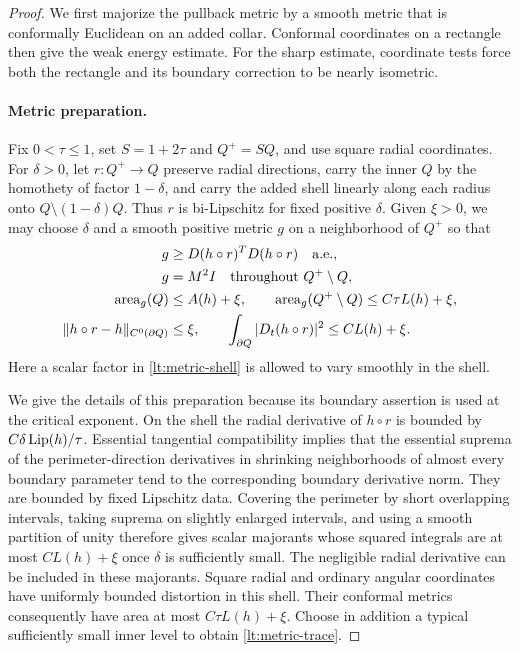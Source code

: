 \begin{proof}
We first majorize the pullback metric by a smooth metric that is
conformally Euclidean on an added collar. Conformal coordinates on a
rectangle then give the weak energy estimate. For the sharp estimate,
coordinate tests force both the rectangle and its boundary correction
to be nearly isometric.

\paragraph{Metric preparation.}
Fix $0<\tau\leq1$, set $S=1+2\tau$ and
$Q^+=SQ$, and use square radial coordinates.  For $\delta>0$, let
$r:Q^+\to Q$ preserve radial directions, carry the inner $Q$ by the
homothety of factor $1-\delta$, and carry the added shell linearly along
each radius onto $Q\setminus(1-\delta)Q$.  Thus $r$ is bi-Lipschitz
for fixed positive $\delta$.  Given $\xi>0$, we may choose $\delta$
and a smooth positive metric $g$ on a neighborhood of $Q^+$ so that
\begin{align}
 g&\geq D(h\circ r)^TD(h\circ r)\quad\hbox{a.e.},
       \label{lt:metric-dominates}\\
 g&=M^2I\quad\hbox{throughout }Q^+\setminus Q,
       \label{lt:metric-shell}\\
 \operatorname{area}_g(Q)&\leq A(h)+\xi,
 \qquad
 \operatorname{area}_g(Q^+\setminus Q)
       \leq C\tau L(h)+\xi,                 \label{lt:metric-area}\\
 \|h\circ r-h\|_{C^0(\partial Q)}&\leq\xi,
 \qquad
 \int_{\partial Q}|D_t(h\circ r)|^2
       \leq CL(h)+\xi.                    \label{lt:metric-trace}
\end{align}
Here a scalar factor in \eqref{lt:metric-shell} is allowed to vary
smoothly in the shell.

We give the details of this preparation because its boundary assertion
is used at the critical exponent.  On the shell the radial derivative
of $h\circ r$ is bounded by $C\delta\operatorname{Lip}(h)/\tau$.  Essential
tangential compatibility implies that the essential suprema of the
perimeter-direction derivatives in shrinking neighborhoods of almost
every boundary parameter tend to the corresponding boundary derivative
norm.  They are bounded by fixed Lipschitz data.  Covering the perimeter
by short overlapping intervals, taking suprema on slightly enlarged
intervals, and using a smooth partition of unity therefore gives scalar
majorants whose squared integrals are at most $CL(h)+\xi$ once
$\delta$ is sufficiently small.  The negligible radial derivative can
be included in these majorants.  Square radial and ordinary angular
coordinates have uniformly bounded distortion in this shell.  Their
conformal metrics consequently have area at most $C\tau L(h)+\xi$.
Choose in addition a typical sufficiently small inner level to obtain
\eqref{lt:metric-trace}.


\end{proof}
